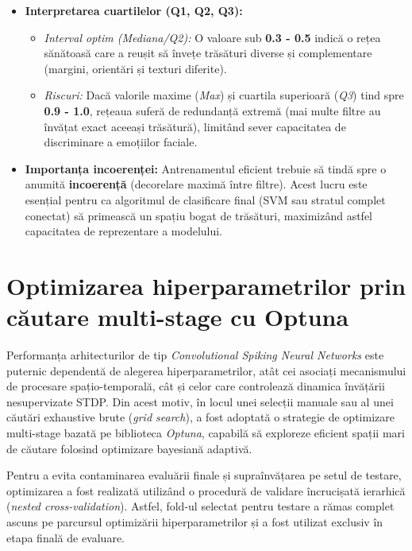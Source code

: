 \begin{itemize}
	\item \textbf{Interpretarea cuartilelor (Q1, Q2, Q3):}
	\begin{itemize}
		\item \textit{Interval optim (Mediana/Q2):} O valoare sub \textbf{0.3 - 0.5} indică o rețea sănătoasă care a reușit să învețe trăsături diverse și complementare (margini, orientări și texturi diferite). 
		\item \textit{Riscuri:} Dacă valorile maxime (\textit{Max}) și cuartila superioară (\textit{Q3}) tind spre \textbf{0.9 - 1.0}, rețeaua suferă de redundanță extremă (mai multe filtre au învățat exact aceeași trăsătură), limitând sever capacitatea de discriminare a e\-mo\-ți\-i\-lor faciale.
	\end{itemize}
	\item \textbf{Importanța incoerenței:} Antrenamentul eficient trebuie să tindă spre o anumită \textbf{incoerență} (decorelare maximă între filtre). Acest lucru este esențial pentru ca algoritmul de clasificare final (SVM sau stratul complet conectat) să primească un spațiu bogat de trăsături, maximizând astfel capacitatea de reprezentare a modelului.
\end{itemize}


\section{Optimizarea hiperparametrilor prin căutare multi-stage cu Optuna}

Performanța arhitecturilor de tip \textit{Convolutional Spiking Neural Networks} este puternic dependentă de alegerea hiperparametrilor, atât cei asociați mecanismului de procesare spațio-temporală, cât și celor care controlează dinamica învățării nesupervizate STDP. Din acest motiv, în locul unei selecții manuale sau al unei căutări exhaustive brute (\textit{grid search}), a fost adoptată o strategie de optimizare multi-stage bazată pe biblioteca \textit{Optuna}, capabilă să exploreze eficient spații mari de căutare folosind optimizare bayesiană adaptivă.

Pentru a evita contaminarea evaluării finale și supraînvățarea pe setul de testare, optimizarea a fost realizată utilizând o procedură de validare încrucișată ierarhică (\textit{nested cross-validation}). Astfel, fold-ul selectat pentru testare a rămas complet ascuns pe parcursul optimizării hiperparametrilor și a fost utilizat exclusiv în etapa finală de evaluare.

